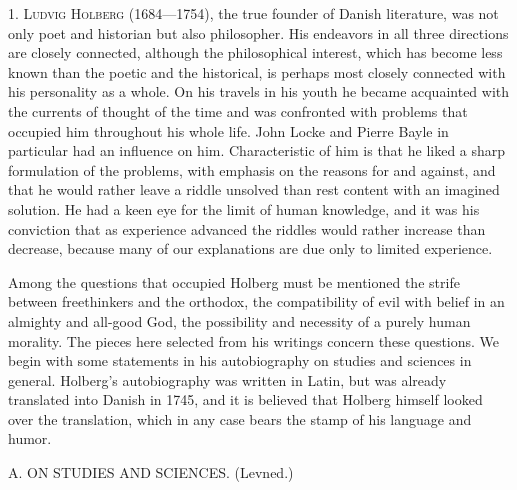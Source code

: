 \documentclass[12pt,a4paper,openany]{book}
\newcommand{\excerpthead}[1]{\par\bigskip\begin{center}#1\end{center}\nopagebreak\smallskip}
\newenvironment{intro}{\par}{\par}
\begin{document}
\begin{intro}

1. \textsc{Ludvig Holberg} (1684---1754), the true founder of Danish
literature, was not only poet and historian but also philosopher. His endeavors
in all three directions are closely connected, although the philosophical
interest, which has become less known than the poetic and the historical, is
perhaps most closely connected with his personality as a whole. On his travels
in his youth he became acquainted with the currents of thought of the time and
was confronted with problems that occupied him throughout his whole life.
John Locke and Pierre Bayle in particular had an influence on him.
Characteristic of him is that he liked a sharp formulation of the problems,
with emphasis on the reasons for and against, and that he would rather leave a
riddle unsolved than rest content with an imagined solution. He had a keen eye
for the limit of human knowledge, and it was his conviction that as experience
advanced the riddles would rather increase than decrease, because many of our
explanations are due only to limited experience.

Among the questions that occupied Holberg must be mentioned the strife between
freethinkers and the orthodox, the compatibility of evil with belief in an
almighty and all-good God, the possibility and necessity of a purely human
morality. The pieces here selected from his writings concern these questions.
We begin with some statements in his autobiography on studies and sciences in
general. Holberg's autobiography was written in Latin, but was already
translated into Danish in 1745, and it is believed that Holberg himself
looked over the translation, which in any case bears the stamp of his language
and humor.
\end{intro}

\excerpthead{A. ON STUDIES AND SCIENCES. (Levned.)}
\end{document}
